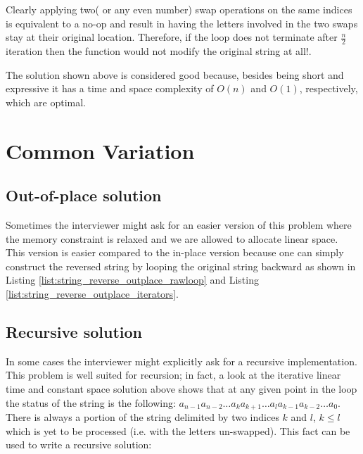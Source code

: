 Clearly applying two( or any even number) swap operations on the same indices is equivalent to a no-op and result in having the letters involved in the two swaps stay at their original location.
Therefore, if the loop does not terminate after $\frac{n}{2}$ iteration then the function would not
modify the original string at all!. 

The solution shown above is considered good because, besides being short and expressive it has a time and space complexity of $O(n)$ and $O(1)$, respectively, which are optimal. 










\section{Common Variation}
\label{string_reverse:sec:variations}

\subsection{Out-of-place solution}
Sometimes the interviewer might ask for an easier version of this problem where the memory constraint is relaxed and we are allowed to allocate linear space.
This version is easier compared to the in-place version because one
can simply construct the reversed string by looping the original string backward as shown in Listing \ref{list:string_reverse_outplace_rawloop} and Listing \ref{list:string_reverse_outplace_iterators}.





\subsection{Recursive solution}
In some cases the interviewer might explicitly ask for a recursive implementation.
This problem is well suited for recursion; in fact, a look at the iterative linear time and constant space solution above shows
that at any given point in the loop the status of the string is the following: $a_{n-1}a_{n-2}
\ldots a_k a_{k+1} \ldots a_l a_{k-1}a_{k-2} \ldots a_0$. 
There is always a portion of the string delimited by two indices $k$ and $l$, $k \leq l$ which is yet to be
processed (i.e. with the letters un-swapped). 
This fact can be used to write a recursive solution:

